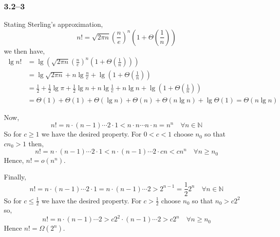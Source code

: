 \subsubsection*{3.2--3}

Stating Sterling's approximation,
\begin{equation*}
	n! = \sqrt{2\pi n}\left(\frac{n}{e}\right)^{n}\left(1+\Theta\left(\frac{1}{n}\right)\right)
\end{equation*}
we then have,
\begin{equation*}
	\begin{aligned}
		\lg n! &= \lg\left(\sqrt{2\pi n}\left(\frac{n}{e}\right)^{n}\left(1+\Theta\left(\frac{1}{n}\right)\right)\right)\\
		&= \lg \sqrt{2\pi n} + n\lg \frac{n}{e} + \lg\left(1+\Theta\left(\frac{1}{n}\right)\right)\\
		&= \frac{1}{2}+\frac{1}{2}\lg\pi + \frac{1}{2}\lg n + n\lg\frac{1}{e} + n\lg n + \lg\left(1+\Theta\left(\frac{1}{n}\right)\right)\\
		&= \Theta(1) + \Theta(1) + \Theta(\lg n) + \Theta(n) + \Theta(n\lg n) + \lg\Theta(1) = \Theta(n\lg n)
	\end{aligned}
\end{equation*}

Now,
\begin{equation*}
	n! = n\cdot(n-1)\cdots2\cdot1 < n\cdot n\cdots n\cdot n = n^{n}\quad\forall n\in\mathbb{N}
\end{equation*}
So for $c\geq 1$ we have the desired property. For $0<c<1$ choose $n_{0}$ so that $cn_{0} > 1$ then,
\begin{equation*}
	n! = n\cdot(n-1)\cdots2\cdot1 < n\cdot(n-1)\cdots2\cdot cn < c n^{n}\quad\forall n\geq n_{0}
\end{equation*}
Hence, $n!=o(n^{n})$.

Finally,
\begin{equation*}
	n! = n\cdot(n-1)\cdots 2\cdot1 = n\cdot(n-1)\cdots 2 > 2^{n-1}=\frac{1}{2}2^{n}\quad\forall n\in\mathbb{N}
\end{equation*}
So for $c\leq\frac{1}{2}$ we have the desired property. For $c>\frac{1}{2}$ choose $n_{0}$ so that $n_{0}>c2^{2}$ so,
\begin{equation*}
	n! = n\cdot(n-1)\cdots2>c2^{2}\cdot(n-1)\cdots2>c2^{n}\quad\forall n\geq n_{0}
\end{equation*}
Hence $n!=\Omega(2^{n})$.

